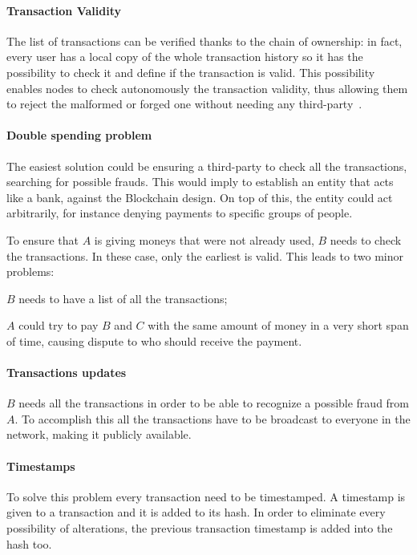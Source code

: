 \paragraph*{Transaction Validity}
The list of transactions can be verified thanks to the chain of ownership:
in fact, every user has a local copy of the whole transaction history so it has
the possibility to check it and define if the transaction is valid.
This possibility enables nodes to check autonomously the transaction validity,
thus allowing them to reject the malformed or forged one without needing any
third-party~\cite{nakamoto08}.

\paragraph*{Double spending problem}
The easiest solution could be ensuring a third-party to check all the
transactions, searching for possible frauds. This would imply to establish an
entity that acts like a bank, against the Blockchain design. On top of this,
the entity could act arbitrarily, for instance denying payments to specific
groups of people.

To ensure that $A$ is giving moneys that were not already used, $B$ needs to
check the transactions. In these case, only the earliest is
valid\cite{nakamoto08}. This leads to two minor problems:
\begin{enumerate*}[label=\roman*)]
 \item $B$ needs to have a list of all the transactions;
 \item $A$ could try to pay $B$ and $C$ with the same amount of money in a very
short span of time, causing dispute to who should receive the payment.
\end{enumerate*}

\paragraph*{Transactions updates}
\label{TU}
$B$ needs all the transactions in order to be able to recognize a possible
fraud from $A$. To accomplish this all the transactions have to be broadcast to
everyone in the network, making it publicly available.

\paragraph*{Timestamps}
To solve this problem every transaction need to be timestamped. A timestamp is
given to a transaction and it is added to its hash. In order to eliminate every
possibility of alterations, the previous transaction timestamp is added into
the hash too\cite{nakamoto08}.

